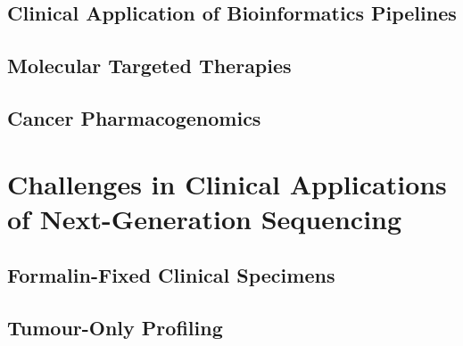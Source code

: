 \subsection{Clinical Application of Bioinformatics Pipelines}

\subsection{Molecular Targeted Therapies}

\subsection{Cancer Pharmacogenomics}

\section{Challenges in Clinical Applications of Next-Generation Sequencing}
\label{sec:ChallengesinClinicalApplicationsofNext-GenerationSequencing}

\subsection{Formalin-Fixed Clinical Specimens}

\subsection{Tumour-Only Profiling}

